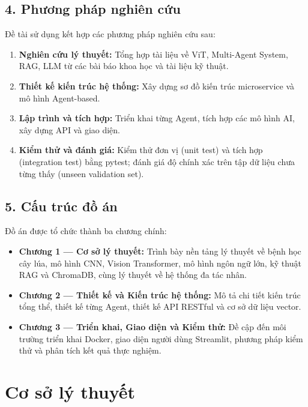\documentclass[13pt,a4paper]{extreport}
\begin{document}
\section*{4. Phương pháp nghiên cứu}
Đề tài sử dụng kết hợp các phương pháp nghiên cứu sau:
\begin{enumerate}[leftmargin=1.5cm]
    \item \textbf{Nghiên cứu lý thuyết:} Tổng hợp tài liệu về ViT, Multi-Agent System, RAG, LLM từ các bài báo khoa học và tài liệu kỹ thuật.
    \item \textbf{Thiết kế kiến trúc hệ thống:} Xây dựng sơ đồ kiến trúc microservice và mô hình Agent-based.
    \item \textbf{Lập trình và tích hợp:} Triển khai từng Agent, tích hợp các mô hình AI, xây dựng API và giao diện.
    \item \textbf{Kiểm thử và đánh giá:} Kiểm thử đơn vị (unit test) và tích hợp (integration test) bằng pytest; đánh giá độ chính xác trên tập dữ liệu chưa từng thấy (unseen validation set).
\end{enumerate}

\section*{5. Cấu trúc đồ án}
Đồ án được tổ chức thành ba chương chính:

\begin{itemize}[leftmargin=1.5cm]
    \item \textbf{Chương 1 --- Cơ sở lý thuyết:} Trình bày nền tảng lý thuyết về bệnh học cây lúa, mô hình CNN, Vision Transformer, mô hình ngôn ngữ lớn, kỹ thuật RAG và ChromaDB, cùng lý thuyết về hệ thống đa tác nhân.
    \item \textbf{Chương 2 --- Thiết kế và Kiến trúc hệ thống:} Mô tả chi tiết kiến trúc tổng thể, thiết kế từng Agent, thiết kế API RESTful và cơ sở dữ liệu vector.
    \item \textbf{Chương 3 --- Triển khai, Giao diện và Kiểm thử:} Đề cập đến môi trường triển khai Docker, giao diện người dùng Streamlit, phương pháp kiểm thử và phân tích kết quả thực nghiệm.
\end{itemize}
\clearpage

\chapter{Cơ sở lý thuyết}
\end{document}
